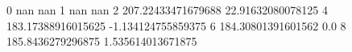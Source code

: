 0 nan nan
1 nan nan
2 207.22433471679688 22.91632080078125
4 183.17388916015625 -1.134124755859375
6 184.30801391601562 0.0
8 185.8436279296875 1.535614013671875
